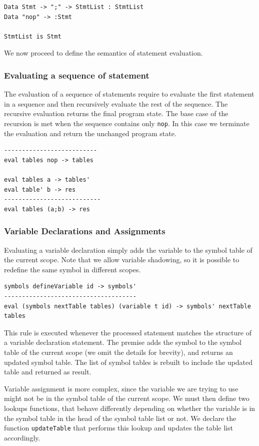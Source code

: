 \begin{lstlisting}
Data Stmt -> ";" -> StmtList : StmtList
Data "nop" -> :Stmt

StmtList is Stmt

\end{lstlisting}

We now proceed to define the semantics of statement evaluation.

\subsubsection{Evaluating a sequence of statement}
The evaluation of a sequence of statements require to evaluate the first statement in a sequence and then recursively evaluate the rest of the sequence. The recursive evaluation returns the final program state. The base case of the recursion is met when the sequence contains only \texttt{nop}. In this case we terminate the evaluation and return the unchanged program state.

\begin{lstlisting}
--------------------------
eval tables nop -> tables

eval tables a -> tables'
eval table' b -> res
---------------------------
eval tables (a;b) -> res
\end{lstlisting}

\subsubsection{Variable Declarations and Assignments}
Evaluating a variable declaration simply adds the variable to the symbol table of the current scope. Note that we allow variable shadowing, so it is possible to redefine the same symbol in different scopes.

\begin{lstlisting}
symbols defineVariable id -> symbols'
-------------------------------------
eval (symbols nextTable tables) (variable t id) -> symbols' nextTable tables
\end{lstlisting}

\noindent
This rule is executed whenever the processed statement matches the structure of a variable declaration statement. The premise adds the symbol to the symbol table of the current scope (we omit the details for brevity), and returns an updated symbol table. The list of symbol 
tables is rebuilt to include the updated table and returned as result.

Variable assignment is more complex, since the variable we are trying to use might not be in the symbol table of the current scope. We must then define two lookups functions, that behave differently depending on whether the variable is in the symbol table in the head of the symbol table list or not. We declare the function \texttt{updateTable} that performs this lookup and updates the table list accordingly. 

